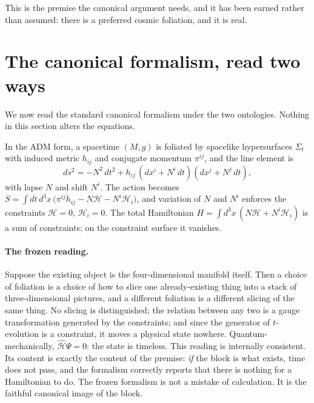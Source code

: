 \documentclass[11pt,a4paper]{article}
\theoremstyle{plain}
\theoremstyle{definition}
\theoremstyle{remark}
\begin{document}
This is the premise the canonical argument needs, and it has been earned rather than assumed: there is a preferred cosmic foliation, and it is real.

\section{The canonical formalism, read two ways}\label{sec:two-readings}

We now read the standard canonical formalism under the two ontologies. Nothing in this section alters the equations.

In the ADM form, a spacetime $(M,g)$ is foliated by spacelike hypersurfaces $\Sigma_t$ with induced metric $h_{ij}$ and conjugate momentum $\pi^{ij}$, and the line element is
\begin{equation}
ds^2 = -N^2\,dt^2 + h_{ij}\,(dx^i + N^i\,dt)(dx^j + N^j\,dt),
\end{equation}
with lapse $N$ and shift $N^i$. The action becomes $S = \int dt\,d^3x\,\big(\pi^{ij}\dot h_{ij} - N\mathcal{H} - N^i\mathcal{H}_i\big)$, and variation of $N$ and $N^i$ enforces the constraints $\mathcal{H}=0$, $\mathcal{H}_i=0$. The total Hamiltonian $H = \int d^3x\,(N\mathcal{H} + N^i\mathcal{H}_i)$ is a sum of constraints; on the constraint surface it vanishes.

\paragraph{The frozen reading.}
Suppose the existing object is the four-dimensional manifold itself. Then a choice of foliation is a choice of how to slice one already-existing thing into a stack of three-dimensional pictures, and a different foliation is a different slicing of the same thing. No slicing is distinguished; the relation between any two is a gauge transformation generated by the constraints; and since the generator of $t$-evolution is a constraint, it moves a physical state nowhere. Quantum-mechanically, $\hat{\mathcal{H}}\Psi=0$: the state is timeless. This reading is internally consistent. Its content is exactly the content of the premise: \emph{if} the block is what exists, time does not pass, and the formalism correctly reports that there is nothing for a Hamiltonian to do. The frozen formalism is not a mistake of calculation. It is the faithful canonical image of the block.
\end{document}

